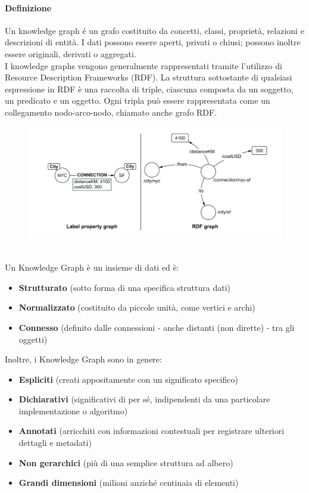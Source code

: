 \paragraph{Definizione} Un knowledge graph é un grafo costituito da concetti, classi, proprietà, relazioni e descrizioni di entità. I dati possono essere aperti, privati o chiusi; possono inoltre essere originali, derivati o aggregati. 
\\
I knowledge graphs vengono generalmente rappresentati tramite l'utilizzo di Resource Description Frameworks (RDF). La struttura sottostante di qualsiasi espressione in RDF è una raccolta di triple, ciascuna composta da un soggetto, un predicato e un oggetto. Ogni tripla può essere rappresentata come un collegamento nodo-arco-nodo, chiamato anche grafo RDF.
\\
\begin{figure}[th]
    \centering
    \includegraphics[width=0.8\linewidth]{KnowledgeGraphs//img/labelvsrdf.png}
\end{figure}
\\
Un Knowledge Graph è un insieme di dati ed è:
\begin{itemize}
    \item \textbf{Strutturato} (sotto forma di una specifica struttura dati)
    \item \textbf{Normalizzato} (costituito da piccole unità, come vertici e archi)
    \item \textbf{Connesso} (definito dalle connessioni - anche distanti (non dirette) - tra gli oggetti)
\end{itemize}
Inoltre, i Knowledge Graph sono in genere:
\begin{itemize}
    \item \textbf{Espliciti} (creati appositamente con un significato specifico)
    \item \textbf{Dichiarativi} (significativi di per sé, indipendenti da una particolare implementazione o algoritmo)
    \item \textbf{Annotati} (arricchiti con informazioni contestuali per registrare ulteriori dettagli e metadati)
    \item \textbf{Non gerarchici} (più di una semplice struttura ad albero)
    \item \textbf{Grandi dimensioni} (milioni anziché centinaia di elementi)
\end{itemize}

